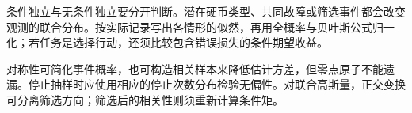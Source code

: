 条件独立与无条件独立要分开判断。潜在硬币类型、共同故障或筛选事件都会改变观测的联合分布。按实际记录写出各情形的似然，再用全概率与贝叶斯公式归一化；若任务是选择行动，还须比较包含错误损失的条件期望收益。

对称性可简化事件概率，也可构造相关样本来降低估计方差，但零点原子不能遗漏。停止抽样时应使用相应的停止次数分布检验无偏性。对联合高斯量，正交变换可分离筛选方向；筛选后的相关性则须重新计算条件矩。
\par\smallskip

